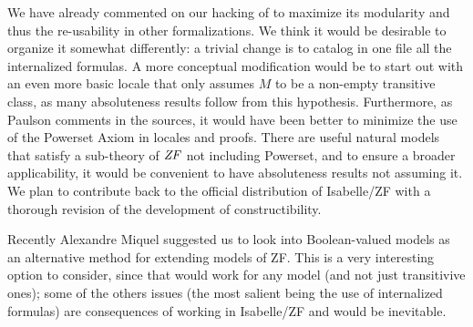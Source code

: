 We have already commented on our hacking of 
to maximize its modularity and thus the re-usability in other
formalizations. We think it would be desirable to organize it
somewhat differently: a trivial change is to catalog in one file all
the internalized formulas. A more
conceptual modification would be to start out with an even more basic
locale that only assumes $M$ to be a non-empty transitive class, as
many absoluteness results follow from this hypothesis. Furthermore, as
Paulson comments in the 
sources, it would have been better to minimize the use of the Powerset
Axiom in locales and proofs. There are useful natural models that
satisfy a sub-theory of $\mathit{ZF}$ not including Powerset, and to ensure a
broader applicability, it would be convenient to have absoluteness
results not assuming it. We plan to contribute back to the official
distribution of Isabelle/ZF with a thorough revision of the development of
constructibility.

Recently Alexandre Miquel suggested us to look into Boolean-valued
models as an alternative method for extending models of ZF. This is a
very interesting option to consider, since that would work for any
model (and not just transitivive ones); some of the others issues (the
most salient being the use of internalized formulas) are consequences
of working in Isabelle/ZF and would be inevitable.




